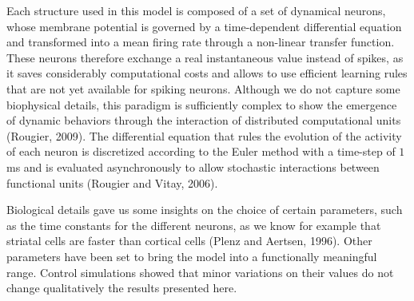 \documentclass[
  11pt,
  a4paper,
]{scrbook}
\begin{document}
Each structure used in this model is composed of a set of dynamical
neurons, whose membrane potential is governed by a time-dependent
differential equation and transformed into a mean firing rate through a
non-linear transfer function. These neurons therefore exchange a real
instantaneous value instead of spikes, as it saves considerably
computational costs and allows to use efficient learning rules that are
not yet available for spiking neurons. Although we do not capture some
biophysical details, this paradigm is sufficiently complex to show the
emergence of dynamic behaviors through the interaction of distributed
computational units (Rougier, 2009). The differential equation that
rules the evolution of the activity of each neuron is discretized
according to the Euler method with a time-step of \(1\) ms and is
evaluated asynchronously to allow stochastic interactions between
functional units (Rougier and Vitay, 2006).

Biological details gave us some insights on the choice of certain
parameters, such as the time constants for the different neurons, as we
know for example that striatal cells are faster than cortical cells
(Plenz and Aertsen, 1996). Other parameters have been set to bring the
model into a functionally meaningful range. Control simulations showed
that minor variations on their values do not change qualitatively the
results presented here.
\end{document}
